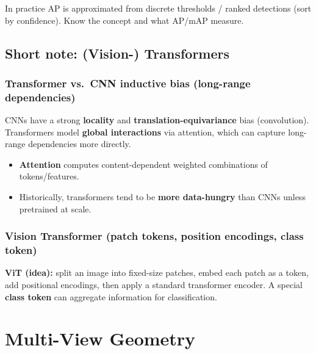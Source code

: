 \documentclass[11pt,a4paper]{article}
\begin{document}
\begin{notebox}
In practice AP is approximated from discrete thresholds / ranked detections (sort by confidence).
Know the concept and what AP/mAP measure.
\end{notebox}

\subsection{Short note: (Vision-) Transformers}

\subsubsection{Transformer vs.\ CNN inductive bias (long-range dependencies)}

\begin{intbox}
CNNs have a strong \textbf{locality} and \textbf{translation-equivariance} bias (convolution).
Transformers model \textbf{global interactions} via attention, which can capture long-range dependencies more directly.
\end{intbox}

\begin{itemize}
  \item \textbf{Attention} computes content-dependent weighted combinations of tokens/features.
  \item Historically, transformers tend to be \textbf{more data-hungry} than CNNs unless pretrained at scale.
\end{itemize}

\subsubsection{Vision Transformer (patch tokens, position encodings, class token)}

\begin{defbox}
\textbf{ViT (idea):} split an image into fixed-size patches, embed each patch as a token, add positional encodings,
then apply a standard transformer encoder. A special \textbf{class token} can aggregate information for classification.
\end{defbox}

\section{Multi-View Geometry}
\end{document}
